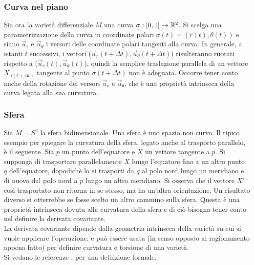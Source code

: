 \subsubsection{Curva nel piano}
Sia ora la varietà differenziale $M$ una curva $\sigma : [0,1] \to \mathbb{R}^2$. Si scelga
una parametrizzazione della curva in coordinate polari $\sigma(t) = (r(t),\theta(t))$ e
siano $\vec u _r$ e $\vec u _\theta$ i versori delle coordinate polari tangenti
alla curva. In generale, a istanti $t$ successivi, i vettori
($\vec u _r (t+\Delta t) ,\vec u _\theta (t + \Delta t)$) risulteranno ruotati
rispetto a ($\vec u _r (t), \vec u _\theta (t) $), quindi la semplice traslazione
parallela di un vettore $X_{\sigma(t+\Delta t)}$ tangente al punto $\sigma(t + \Delta t)$
non è adeguata. Occorre tener conto anche della rotazione dei versori
$\vec u _r$ e $\vec u _\theta$, che è una proprietà intrinseca della curva legata
alla sua curvatura.

\subsubsection{Sfera}
Sia $M=S^2$ la sfera bidimensionale. Una sfera è uno spazio non curvo. Il tipico
esempio per spiegare la curvatura della sfera, legato anche al trasporto parallelo,
è il seguente. Sia $p$ un punto dell'equatore e $X$ un vettore tangente a $p$. Si
supponga di trasportare parallelamente $X$ lungo l'equatore fino a un altro punto
$q$ dell'equatore, dopodichè lo si trasporti da $q$ al polo nord lungo un meridiano
e di nuovo dal polo nord a $p$ lungo un altro meridiano. Si osserva che il vettore
$X'$ così trasportato non ritorna in se stesso, ma ha un'altra orientazione. Un
risultato diverso si otterrebbe se fosse scelto un altro cammino sulla sfera.
Questa è una proprietà intrinseca dovuta alla curvatura della sfera e di ciò
bisogna tener conto nel definire la derivata covariante.\\

La derivata covariante dipende dalla geometria intrinseca della varietà su cui
si vuole applicare l'operazione, e può essere usata (in senso opposto al ragionamento
appena fatto) per definire curvatura e torsione di una varietà.\\
Si vedano le referenze \cite{boothby},\cite{nakahara} per una definzione formale.
